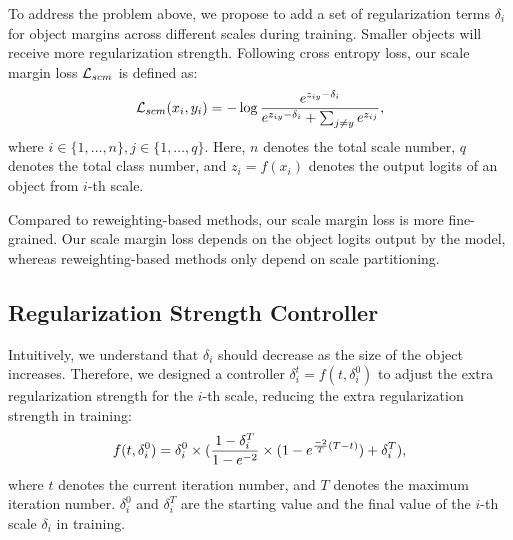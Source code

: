 \documentclass{article}
\begin{document}
To address the problem above, we propose to add a set of regularization terms $\delta_i$ for object margins across different scales during training. Smaller objects will receive more regularization strength. Following cross entropy loss, our scale margin loss ${\cal L}_{scm}$ is defined as:
%
\begin{equation}
\label{scale_margin}
\centering
\begin{split}
\L_{scm}(x_{i},y_{i}) & = - \log \frac{e^{z_{iy}-\delta_{i}}}{e^{z_{iy}-\delta_{i}} + \sum_{j\neq y} e^{z_{ij}}}, \\
\end{split}
\end{equation}
where $i \in \{1,\dots, n\}, j \in \{1,\dots, q\}$.
Here, $n$ denotes the total scale number, $q$ denotes the total class number, and $z_i=f(x_i)$ denotes the output logits of an object from $i$-th scale. 


Compared to reweighting-based methods, our scale margin loss is more fine-grained. Our scale margin loss depends on the object logits output by the model, whereas reweighting-based methods only depend on scale partitioning. 

\subsection{Regularization Strength Controller}
\label{section_3_3}

Intuitively, we understand that $\delta_{i}$ should decrease as the size of the object increases. %
Therefore, we designed a controller $\delta^{t}_{i} = f(t, \delta^{0}_{i})$ to adjust the extra regularization strength for the $i$-th scale, reducing the extra regularization strength in training: %
%
\begin{equation}
\label{exp_decay}
\centering
\begin{split}
f(t, \delta^{0}_{i}) &= \delta^{0}_{i} \times (\frac{1 - \delta^{T}_{i}}{1 - e^{-2}} \times (1 - e^{\frac{-2}{T} (T-t)}) + \delta^{T}_{i}), \\
\end{split}
\end{equation}
where $t$ denotes the current iteration number, and $T$ denotes the maximum iteration number. $\delta^{0}_{i}$ and $\delta^{T}_{i}$ are the starting value and the final value of the $i$-th scale $\delta_{i}$ in training.
\end{document}
